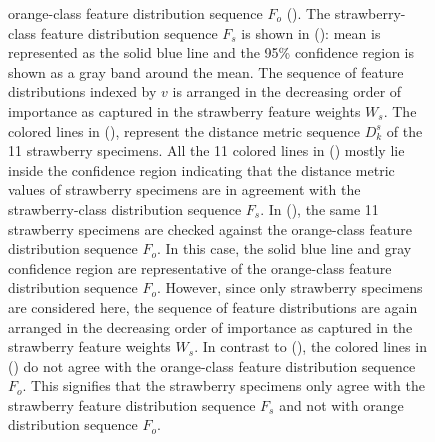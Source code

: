 \documentclass {udthesis}
\begin{document}
\begin{figure}
{orange-class feature distribution sequence $F_o$ 
(). The strawberry-class feature distribution sequence $F_s$ is shown in (): mean is represented as the solid blue line and the 95\% confidence region is shown as a gray band around the mean. The sequence of feature distributions indexed by $v$ is arranged in the decreasing order of importance as captured in the strawberry feature weights $W_s$. The colored lines in (), represent the distance metric sequence $D^s_k$ of the 11 strawberry specimens. All the 11 colored lines in () mostly lie inside the confidence region indicating that the distance metric values of strawberry specimens are in agreement with the strawberry-class distribution sequence $F_s$.
In (), the same 11 strawberry specimens are checked against the orange-class feature distribution sequence $F_o$. In this case, the solid blue line and gray confidence region are representative of the orange-class feature distribution sequence $F_o$. However, since only strawberry specimens are considered here, the sequence of feature distributions are again arranged in the decreasing order of importance as captured in the strawberry feature weights $W_s$. In contrast to (), the colored lines in () do not agree with the orange-class feature distribution sequence $F_o$. This signifies that the strawberry specimens only agree with the strawberry feature distribution sequence $F_s$ and not with orange distribution sequence $F_o$.}
\label{fig:feat_results_strawberry_test}
\end{figure}	
%
\end{document}
